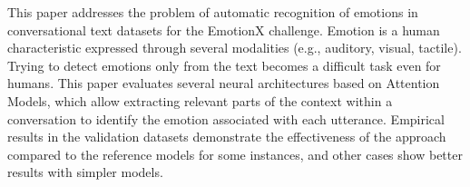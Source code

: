 This paper addresses the problem of automatic recognition of emotions in conversational text datasets for the EmotionX challenge. Emotion is a human characteristic expressed through several modalities (e.g., auditory, visual, tactile). Trying to detect emotions only from the text becomes a difficult task even for humans. This paper evaluates several neural architectures based on Attention Models, which allow extracting relevant parts of the context within a conversation to identify the emotion associated with each utterance. Empirical results in the validation datasets demonstrate the effectiveness of the approach compared to the reference models for some instances, and other cases show better results with simpler models.
